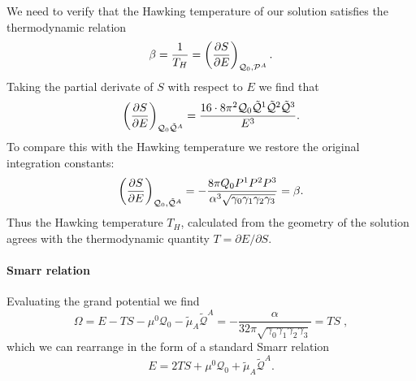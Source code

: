 We need to verify that the Hawking temperature of our solution satisfies the thermodynamic relation
\begin{equation*}
\beta = \frac{1}{T_H} = \left(\frac{\partial S}{\partial E} \right)_{\mathcal{Q}_0, \mathcal{P}^A}.
\end{equation*}
Taking the partial derivate of $S$  with respect to $E$ we find that 
\begin{equation*}
\left(\frac{\partial S}{\partial E} \right)_{\mathcal{Q}_0 \tilde{\mathcal{Q}}^A} = \frac{16\cdot 8\pi^2 \mathcal{Q}_0 \tilde{\mathcal{Q}}^1 \tilde{\mathcal{Q}}^2 \tilde{\mathcal{Q}}^3}{E^3}.
\end{equation*}
To compare this with the Hawking temperature we restore the original integration constants:
\begin{equation*}
        \left(\frac{\partial S}{\partial E} \right)_{\mathcal{Q}_0, \tilde{\mathcal{Q}}^A} 
        = -\frac{8\pi Q_0 P^1 P^2 P^3}{\alpha^3 \sqrt{\gamma_0 \gamma_1 \gamma_2 \gamma_3}} = \beta.
\end{equation*}
Thus the Hawking temperature $T_H$, calculated from the geometry of the solution agrees with the thermodynamic 
quantity $T = \partial E/\partial S$.

\paragraph{Smarr relation}
Evaluating the grand potential we find
\begin{equation*}
        \Omega = E - TS - \mu^0 \mathcal{Q}_0 -\tilde{\mu}_A \tilde{\mathcal{Q}}^A
        = - \frac{\alpha}{32\pi \sqrt{\gamma_0\gamma_1\gamma_2\gamma_3}} = TS \;,
\end{equation*}
which we can rearrange in the form of a 
standard Smarr relation
\begin{equation}
\label{eq:stusmarr}
    E = 2T S + \mu^0 \mathcal{Q}_0 +\tilde{\mu}_A \tilde{\mathcal{Q}}^A.
\end{equation}
